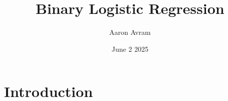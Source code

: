 \documentclass[12pt]{article}
\title{Binary Logistic Regression}
\author{Aaron Avram}
\date{June 2 2025}
\begin{document}
\maketitle

\section*{Introduction}
\end{document}

